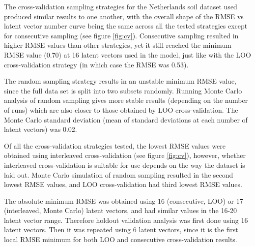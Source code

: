 \documentclass{isprs}
\begin{document}
The cross-validation sampling strategies for the Netherlands soil dataset used produced similar results to one another, with the overall shape of the RMSE vs latent vector number curve being the same across all the tested strategies except for consecutive sampling (see figure \ref{fig:cv}). Consecutive sampling resulted in higher RMSE values than other strategies, yet it still reached the minimum RMSE value (0.70) at 16 latent vectors used in the model, just like with the LOO cross-validation strategy (in which case the RMSE was 0.53).

The random sampling strategy results in an unstable minimum RMSE value, since the full data set is split into two subsets randomly. Running Monte Carlo analysis of random sampling gives more stable results (depending on the number of runs) which are also closer to those obtained by LOO cross-validation. The Monte Carlo standard deviation (mean of standard deviations at each number of latent vectors) was 0.02.

Of all the cross-validation strategies tested, the lowest RMSE values were obtained using interleaved cross-validation (see figure \ref{fig:cv}), however, whether interleaved cross-validation is suitable for use depends on the way the dataset is laid out. Monte Carlo simulation of random sampling resulted in the second lowest RMSE values, and LOO cross-validation had third lowest RMSE values.

The absolute minimum RMSE was obtained using 16 (consecutive, LOO) or 17 (interleaved, Monte Carlo) latent vectors, and had similar values in the 16-20 latent vector range. Therefore holdout validation analysis was first done using 16 latent vectors. Then it was repeated using 6 latent vectors, since it is the first local RMSE minimum for both LOO and consecutive cross-validation results.
\end{document}
